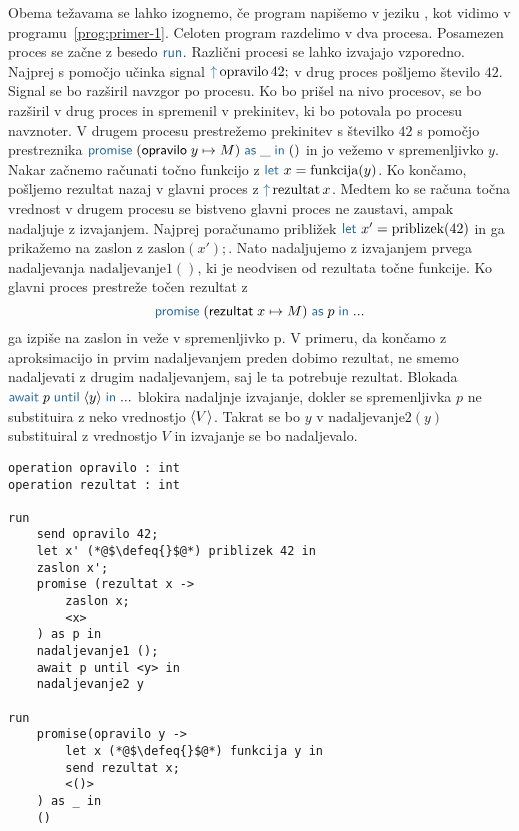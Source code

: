 Obema težavama se lahko izognemo, če program napišemo v jeziku \aeff, kot vidimo v programu~\ref{prog:primer-1}. Celoten program razdelimo v dva procesa. Posamezen proces se začne z besedo $\tmkw{run}$. Različni procesi se lahko izvajajo vzporedno.
Najprej s pomočjo učinka signal $\tmkw{\uparrow}\, \text{opravilo}\,42;$ v drug proces pošljemo število $42$. Signal se bo razširil navzgor po procesu. Ko bo prišel na nivo procesov, se bo razširil v drug proces in spremenil v prekinitev, ki bo potovala po procesu navznoter. V drugem procesu prestrežemo prekinitev s številko $42$ s pomočjo prestreznika $\tmwith{opravilo}{y}{M}{\_}{()}$ in jo vežemo v spremenljivko $y$. Nakar začnemo računati točno funkcijo z $\tmkw{let}\ x = \text{funkcija}(y)$. Ko končamo, pošljemo rezultat nazaj v glavni proces z $\tmkw{\uparrow}\, \text{rezultat}\,x$.
Medtem ko se računa točna vrednost v drugem procesu se bistveno glavni proces ne zaustavi, ampak nadaljuje z izvajanjem. Najprej poračunamo približek $\tmkw{let}\ x' = \text{priblizek}(42)$ in ga prikažemo na zaslon z $\text{zaslon}(x');$. Nato nadaljujemo z izvajanjem prvega nadaljevanja $\text{nadaljevanje}1()$, ki je neodvisen od rezultata točne funkcije. Ko glavni proces prestreže točen rezultat z $$\tmwith{rezultat}{x}{M}{p}{...}$$ ga izpiše na zaslon in veže v spremenljivko p. V primeru, da končamo z aproksimacijo in prvim nadaljevanjem preden dobimo rezultat, ne smemo nadaljevati z drugim nadaljevanjem, saj le ta potrebuje rezultat. Blokada $\tmawait{p}{y}{...}$ blokira nadaljnje izvajanje, dokler se spremenljivka $p$ ne substituira z neko vrednostjo $\langle V \rangle$. Takrat se bo $y$ v $\text{nadaljevanje}2(y)$ substituiral z vrednostjo $V$ in izvajanje se bo nadaljevalo.

\begin{lstlisting}[caption={Asinhron vzporeden primer.},label={prog:primer-1},float,floatplacement=H]
operation opravilo : int
operation rezultat : int

run 
	send opravilo 42;
	let x' (*@$\defeq{}$@*) priblizek 42 in
	zaslon x';
	promise (rezultat x ->
	   	zaslon x;
	   	<x>
	) as p in
	nadaljevanje1 ();
	await p until <y> in
	nadaljevanje2 y

run 
	promise(opravilo y ->
	   	let x (*@$\defeq{}$@*) funkcija y in
	   	send rezultat x;
	   	<()>
	) as _ in
	()
\end{lstlisting}




